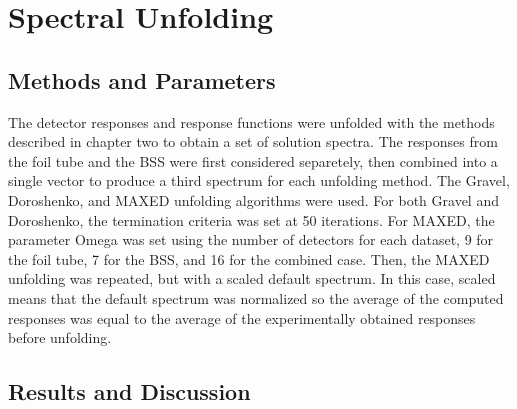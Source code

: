 \section{Spectral Unfolding}

\subsection{Methods and Parameters}

The detector responses and response functions were unfolded with the methods described in chapter two to obtain a set of solution spectra.
The responses from the foil tube and the BSS were first considered separetely, then combined into a single vector to produce a third spectrum for each unfolding method.
The Gravel, Doroshenko, and MAXED unfolding algorithms were used.
For both Gravel and Doroshenko, the termination criteria was set at 50 iterations.
For MAXED, the parameter Omega was set using the number of detectors for each dataset, 9 for the foil tube, 7 for the BSS, and 16 for the combined case.
Then, the MAXED unfolding was repeated, but with a scaled default spectrum.
In this case, scaled means that the default spectrum was normalized so the average of the computed responses was equal to the average of the experimentally obtained responses before unfolding.

\subsection{Results and Discussion}


